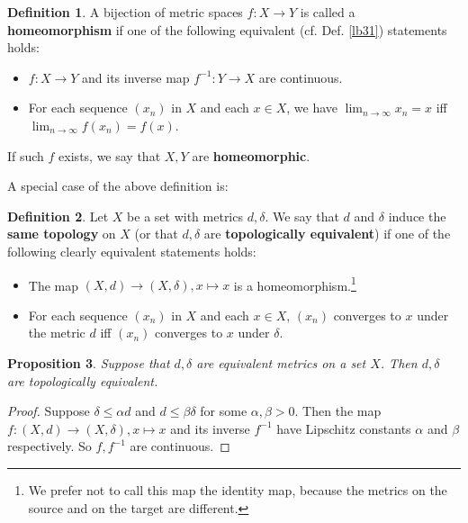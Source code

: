 \documentclass[12pt,b5paper,notitlepage]{article}
\theoremstyle{definition}
\newtheorem{df}{Definition}[section]
\theoremstyle{plain}
\newtheorem{pp}[df]{Proposition}
\newcommand{\dps}{\displaystyle}
\numberwithin{equation}{section}
\begin{document}
\begin{df}
A bijection of metric spaces $f:X\rightarrow Y$ is called a \textbf{homeomorphism} if one of the following equivalent (cf. Def. \ref{lb31}) statements holds:
\begin{itemize}
\item[(1)] $f:X\rightarrow Y$ and its inverse map $f^{-1}:Y\rightarrow X$ are continuous.
\item[(2)] For each sequence $(x_n)$ in $X$ and each $x\in X$, we have $\dps \lim_{n\rightarrow\infty}x_n=x$ iff $\dps\lim_{n\rightarrow\infty}f(x_n)=f(x)$.
\end{itemize}
If such $f$ exists, we say that $X,Y$ are \textbf{homeomorphic}.
\end{df}

A special case of the above definition is:
\begin{df}
Let $X$ be a set with metrics $d,\delta$. We say that $d$ and $\delta$ induce the \textbf{same topology} on $X$ (or that $d,\delta$ are  \textbf{topologically equivalent}) if one of the following clearly equivalent statements holds:
\begin{itemize}
\item[(1)] The map $(X,d)\rightarrow (X,\delta),x\mapsto x$ is a homeomorphism.\footnote{We prefer not to call this map the identity map, because the metrics on the source and on the target are different.}
\item[(2)] For each sequence $(x_n)$ in $X$ and each $x\in X$, $(x_n)$ converges to $x$ under the metric $d$ iff $(x_n)$ converges to $x$ under $\delta$.
\end{itemize}
\end{df}


\begin{pp}\label{lb48}
Suppose that $d,\delta$ are equivalent metrics on a set $X$. Then $d,\delta$ are topologically equivalent.
\end{pp}

\begin{proof}
Suppose $\delta\leq\alpha d$ and $d\leq\beta\delta$ for some $\alpha,\beta>0$. Then the map $f:(X,d)\rightarrow (X,\delta),x\mapsto x$ and its inverse $f^{-1}$ have Lipschitz constants $\alpha$ and $\beta$ respectively. So $f,f^{-1}$ are continuous.
\end{proof}
\end{document}
